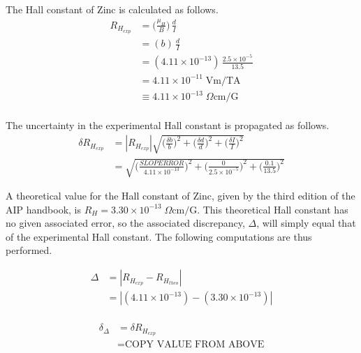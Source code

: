 \documentclass[a4paper]{article}
\begin{document}
The Hall constant of Zinc is calculated as follows.
\begin{align*}
R_{H_{exp}} &= \big( \frac{\mu_H}{B} \big) \, \frac{d}{I} \\
    &= (b) \, \frac{d}{I} \\
    &= (4.11 \times 10^{-13}) \, \frac{2.5 \times 10^{-5}}{13.5} \\
    &= 4.11 \times 10^{-11} \; \text{Vm/TA} \\
    &\equiv 4.11 \times 10^{-13} \; \Omega \text{cm/G} \\
\end{align*}

The uncertainty in the experimental Hall constant is propagated as follows.
\begin{align*}
\delta R_{H_{exp}} &= | R_{H_{exp}} | 
                      \sqrt{
                      	\Big( \frac{\delta b}{b} \Big) ^2
                      	+
                      	\Big( \frac{\delta d}{d} \Big) ^2
                      	+
                      	\Big( \frac{\delta I}{I} \Big) ^2
                      } \\
                       &=
                   	 \sqrt{
                      	\Big( \frac{SLOPERROR}{4.11 \times 10^{-13}} \Big) ^2
                      	+
                      	\Big( \frac{0}{2.5 \times 10^{-5}} \Big) ^2
                      	+
                      	\Big( \frac{0.1}{13.5} \Big) ^2
                      } 
\end{align*}

\qq A theoretical value for the Hall constant of Zinc, given by the
third edition of the AIP handbook, is $R_H = 3.30 \times 10^{-13} \;
\Omega \text{cm/G}$. This theoretical Hall constant has no given
associated error, so the associated discrepancy, $\Delta$, will simply
equal that of the experimental Hall constant. The following
computations are thus performed.

\begin{align*}
\Delta &= | R_{H_{exp}} - R_{H_{theo}} | \\
	   &= | (4.11 \times 10^{-13}) - (3.30 \times 10^{-13}) | \\
\end{align*}

\begin{align*}
\delta_{\Delta} &= \delta R_{H_{exp}} \\
				&= \text{COPY VALUE FROM ABOVE} \\
\end{align*}
\end{document}
